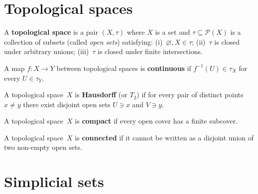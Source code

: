 \section{Topological spaces}\label{sec:app-topology}

\begin{definition}\label{def:app-top-space}
A \textbf{topological space} is a pair $(X, \tau)$ where $X$ is a set
and $\tau\subseteq\mathcal{P}(X)$ is a collection of subsets (called
\emph{open sets}) satisfying: (i)~$\varnothing, X\in\tau$;
(ii)~$\tau$ is closed under arbitrary unions; (iii)~$\tau$ is closed
under finite intersections.
\end{definition}

\begin{definition}\label{def:app-continuous}
A map $f\colon X\to Y$ between topological spaces is \textbf{continuous}
if $f^{-1}(U)\in\tau_X$ for every $U\in\tau_Y$.
\end{definition}

\begin{definition}\label{def:app-hausdorff}
A topological space~$X$ is \textbf{Hausdorff} (or $T_2$) if for every
pair of distinct points $x\ne y$ there exist disjoint open sets
$U\ni x$ and $V\ni y$.
\end{definition}

\begin{definition}\label{def:app-compact}
A topological space~$X$ is \textbf{compact} if every open cover has a
finite subcover.
\end{definition}

\begin{definition}\label{def:app-connected}
A topological space~$X$ is \textbf{connected} if it cannot be written
as a disjoint union of two non-empty open sets.
\end{definition}


\section{Simplicial sets}\label{sec:app-simplicial}

